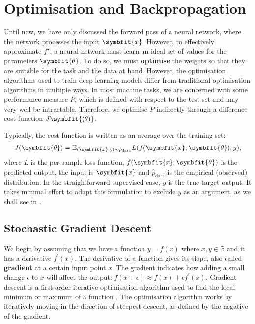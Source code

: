 \section{Optimisation and Backpropagation}\label{sec:optimisation}

Until now, we have only discussed the forward pass of a neural network, where the network processes the input $\symbfit{x}$. However, to effectively approximate $f^\star$, a neural network must learn an ideal set of values for the parameters $\symbfit{\theta}$. To do so, we must \textbf{optimise} the weights so that they are suitable for the task and the data at hand. However, the optimisation algorithms used to train deep learning models differ from traditional optimisation algorithms in multiple ways. In most machine tasks, we are concerned with some performance measure $P$, which is defined with respect to the test set and may very well be intractable. Therefore, we optimise $P$ indirectly through a difference cost function $J\symbfit{(\theta)}$.

Typically, the cost function is written as an average over the training set:
\begin{equation}
\label{eqn:cost-fn-emp}
J(\symbfit{\theta})=\mathbb{E}_{(\symbfit{x}, \mathrm{y}) \sim \hat{p}_{\mathrm{data}}} L(f(\symbfit{x} ; \symbfit{\theta}), y),
\end{equation}
where $L$ is the per-sample loss function, $f(\symbfit{x}; \symbfit{\theta})$ is the predicted output, the input is $\symbfit{x}$ and \(\hat{p}_{\mathrm{data}}\) is the empirical (observed) distribution. In the straightforward supervised case, $y$ is the true target output. It takes minimal effort to adapt this formulation to exclude $y$ as an argument, as we shall see in .


\subsection{Stochastic Gradient Descent}\label{sec:sgd}

We begin by assuming that we have a function $y = f(x)$ where $x, y \in \mathbb{R}$ and it has a derivative $f^\prime(x)$. The derivative of a function gives its slope, also called \textbf{gradient} at a certain input point $x$. The gradient indicates how adding a small change $\epsilon$ to $x$ will affect the output: $f(x + \epsilon) \approx f(x) + \epsilon f^\prime(x)$. Gradient descent is a first-order iterative optimisation algorithm used to find the local minimum or maximum of a function \parencite{Kiefer1952, Robbins1951}. The optimisation algorithm works by iteratively moving in the direction of steepest descent, as defined by the negative of the gradient.

